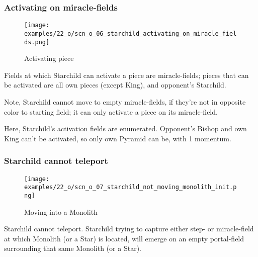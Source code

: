 \subsubsection*{Activating on miracle-fields}
\label{sec:One/Starchild/Movement/Activating on miracle-fields}

\noindent
\begin{wrapfigure}[8]{l}{0.4\textwidth}
\centering
\texttt{[image: examples/22\_o/scn\_o\_06\_starchild\_activating\_on\_miracle\_fields.png]}
\caption{Activating piece}
\label{fig:scn_o_06_starchild_activating_on_miracle_fields}
\end{wrapfigure}
Fields at which Starchild can activate a piece are miracle-fields; pieces that
can be activated are all own pieces (except King), and opponent's Starchild.

Note, Starchild cannot move to empty miracle-fields, if they're not in opposite
color to starting field; it can only activate a piece on its miracle-field.

Here, Starchild's activation fields are enumerated. Opponent's Bishop and own King
can't be activated, so only own Pyramid can be, with 1 momentum.

\clearpage %

\subsubsection*{Starchild cannot teleport}
\label{sec:One/Starchild/Movement/Starchild cannot teleport}

\noindent
\begin{wrapfigure}[6]{l}{0.4\textwidth}
\centering
\texttt{[image: examples/22\_o/scn\_o\_07\_starchild\_not\_moving\_monolith\_init.png]}
\caption{Moving into a Monolith}
\label{fig:scn_o_07_starchild_not_moving_monolith_init}
\end{wrapfigure}
Starchild cannot teleport. Starchild trying to capture either step- or miracle-field
at which Monolith (or a Star) is located, will emerge on an empty portal-field
surrounding that same Monolith (or a Star).

